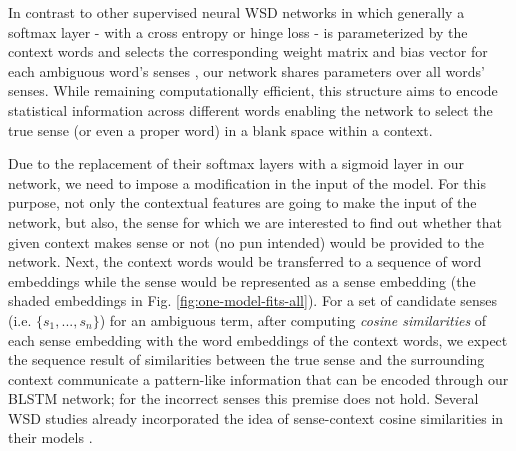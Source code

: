\documentclass{llncs}
\begin{document}
In contrast to other supervised neural WSD networks in which generally a softmax layer - with a cross entropy or hinge loss - is parameterized by the context words and selects the corresponding weight matrix and bias vector for each ambiguous word's senses \cite{kaageback2016word}\cite{taghipour2015semi}, our network shares parameters over all words' senses. While remaining computationally efficient, this structure aims to encode statistical information across different words enabling the network to select the true sense (or even a proper word) in a blank space within a context. 


Due to the replacement of their softmax layers with a sigmoid layer in our network, we need to impose a modification in the input of the model. For this purpose, not only the contextual features are going to make the input of the network, but also, the sense for which we are interested to find out whether that given context makes sense or not (no pun intended) would be provided to the network. Next, the context words would be transferred to a sequence of word embeddings while the sense would be represented as a sense embedding (the shaded embeddings in Fig. \ref{fig:one-model-fits-all}). For a set of candidate senses (i.e. $\{s_1, ..., s_n\}$) for an ambiguous term, after computing \textit{cosine similarities} of each sense embedding with the word embeddings of the context words, we expect the sequence result of similarities between the true sense and the surrounding context communicate a pattern-like information that can be encoded through our BLSTM network; for the incorrect senses this premise does not hold. Several WSD studies already incorporated the idea of sense-context cosine similarities in their models \cite{mcinnes2013evaluating}\cite{pedersen2009wordnet}.
\end{document}
